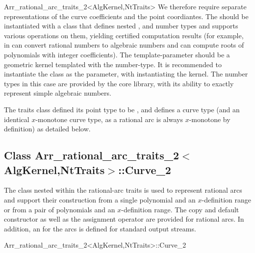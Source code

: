 \begin{ccRefClass}{Arr_rational_arc_traits_2<AlgKernel,NtTraits>}
We therefore require separate representations of the curve coefficients and
the point coordiantes. The  should be instantiated with a class
that defines nested ,  and  number
types and supports various operations on them, yielding certified computation
results (for example, in can convert rational numbers to algebraic numbers
and can compute roots of polynomials with integer coefficients).
The  template-parameter should be a geometric kernel templated
with the  number-type. It is recommended to
instantiate the  class as the 
parameter, with  instantiating the kernel.
The number types in this case are provided by the {\sc core} library, with its
ability to exactly represent simple algebraic numbers.

The traits class defined its point type to be ,
and defines a curve type (and an identical $x$-monotone curve type, as 
a rational arc is always $x$-monotone by definition) as detailed below.


\ccIsModel

\subsection*{Class
         Arr\_rational\_arc\_traits\_2$<$AlgKernel,NtTraits$>$::Curve\_2}

The  class nested within the rational-arc traits is used
to represent rational arcs and support their construction from a
single polynomial and an $x$-definition range or from a pair of polynomials
and an $x$-definition range. The copy and default constructor as well as the
assignment operator are provided for rational arcs. In addition, an
 for the arcs is defined for standard output streams.

\begin{ccClass}{Arr_rational_arc_traits_2<AlgKernel,NtTraits>::Curve_2}

\ccTypes



\end{ccClass}
\end{ccRefClass}
